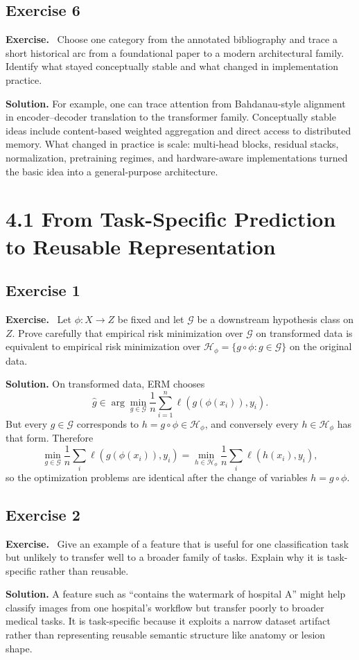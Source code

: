 \documentclass[11pt]{article}
\newenvironment{exercisebox}{\begin{framed}\noindent\textbf{Exercise.}\ }{\end{framed}}
\begin{document}
\subsection*{Exercise 6}
\begin{exercisebox}
Choose one category from the annotated bibliography and trace a short historical arc from a foundational paper to a modern architectural family.
    Identify what stayed conceptually stable and what changed in implementation practice.
\end{exercisebox}
\textbf{Solution.} For example, one can trace attention from Bahdanau-style alignment in encoder--decoder translation to the transformer family. Conceptually stable ideas include content-based weighted aggregation and direct access to distributed memory. What changed in practice is scale: multi-head blocks, residual stacks, normalization, pretraining regimes, and hardware-aware implementations turned the basic idea into a general-purpose architecture.

\section{4.1 From Task-Specific Prediction to Reusable Representation}
\subsection*{Exercise 1}
\begin{exercisebox}
Let \(\phi : X \to Z\) be fixed and let \(\mathcal{G}\) be a downstream hypothesis class on \(Z\).
    Prove carefully that empirical risk minimization over \(\mathcal{G}\) on transformed data is equivalent to empirical risk minimization over \(\mathcal{H}_{\phi} = \{g \circ \phi : g \in \mathcal{G}\}\) on the original data.
\end{exercisebox}
\textbf{Solution.} On transformed data, ERM chooses
\[
\hat g\in\arg\min_{g\in\mathcal G}\frac1n\sum_{i=1}^n \ell(g(\phi(x_i)),y_i).
\]
But every $g\in\mathcal G$ corresponds to $h=g\circ\phi\in\mathcal H_\phi$, and conversely every $h\in\mathcal H_\phi$ has that form. Therefore
\[
\min_{g\in\mathcal G}\frac1n\sum_i\ell(g(\phi(x_i)),y_i)=\min_{h\in\mathcal H_\phi}\frac1n\sum_i\ell(h(x_i),y_i),
\]
so the optimization problems are identical after the change of variables $h=g\circ\phi$.

\subsection*{Exercise 2}
\begin{exercisebox}
Give an example of a feature that is useful for one classification task but unlikely to transfer well to a broader family of tasks.
    Explain why it is task-specific rather than reusable.
\end{exercisebox}
\textbf{Solution.} A feature such as ``contains the watermark of hospital A'' might help classify images from one hospital's workflow but transfer poorly to broader medical tasks. It is task-specific because it exploits a narrow dataset artifact rather than representing reusable semantic structure like anatomy or lesion shape.
\end{document}
